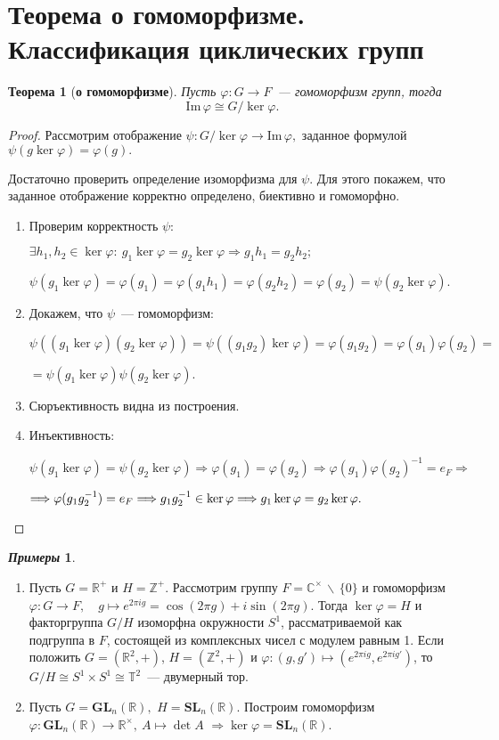 \documentclass[a4paper, 14pt]{extarticle}
\newcommand{\n}{\par}
\newcommand{\integers}{\mathbb{Z}}
\newcommand{\real}{\mathbb{R}}
\newcommand{\complex}{\mathbb{C}}
\newcommand{\GL}{\mathbf{GL}}
\newcommand{\SL}{\mathbf{SL}}
\newcommand{\suchthat}{{:}{ } \ }
\newcommand{\im}{\mathrm{Im} \,}
\renewcommand{\phi}{\varphi}
\theoremstyle{definition}
\newtheorem*{exmpls}{\textit{Примеры}}
\theoremstyle{plain}
\newtheorem*{theorem*}{Теорема}
\numberwithin{theorem}{section}
\numberwithin{definition}{section}
\numberwithin{statement}{section}
\numberwithin{lemma}{section}
\numberwithin{consequence}{section}
\begin{document}
	\section{Теорема о гомоморфизме. Классификация циклических групп}
	\begin{theorem*}[\textbf{о гомоморфизме}]
		Пусть ${\phi: G \rightarrow F}$~--- гомоморфизм групп, тогда
		\begin{equation*}
			\im \phi \cong G/ \ker \phi.
		\end{equation*}
	\end{theorem*}
	\begin{proof}
		Рассмотрим отображение ${\psi: G/ \ker \phi \rightarrow \im \phi,}$ заданное формулой ${\psi(g \ker \phi) = \phi(g).}$ \n
		Достаточно проверить определение изоморфизма для $\psi.$ Для этого покажем, что заданное отображение корректно определено, биективно и гомоморфно.
		\begin{enumerate}
			\setlength\itemsep{0.1em}
			\item Проверим корректность $\psi{:}$ \n
			$\exists h_1, h_2 \in \ker \phi \suchthat g_1 \ker \phi = g_2 \ker \phi \Longrightarrow g_1 h_1 = g_2 h_2;$ \n
			$\psi(g_1 \ker \phi) = \phi(g_1) = \phi(g_1 h_1) = \phi(g_2 h_2) = \phi(g_2) = \psi(g_2 \ker \phi).$
			\item Докажем, что $\psi$~--- гомоморфизм: \n
			${\psi((g_1 \ker \phi)(g_2 \ker \phi)) = \psi ((g_1g_2) \ker \phi) = \phi(g_1 g_2) = \phi(g_1) \phi(g_2) =}$ \n
			${=\psi(g_1 \ker \phi) \psi(g_2 \ker \phi).}$
			\item Сюръективность видна из построения.
			\item Инъективность: \n
			${\psi(g_1 \ker \phi) = \psi(g_2 \ker \phi) \Longrightarrow \phi(g_1) = \phi(g_2) \Longrightarrow \phi(g_1) \phi(g_2)^{-1} = e_F \Longrightarrow}$ \n $\Longrightarrow \phi(g_1g_2^{-1}) = e_F \Longrightarrow g_1g_2^{-1} \in \ker \phi \Longrightarrow g_1 \ker \phi = g_2 \ker \phi. \qedhere$
		\end{enumerate} 
	\end{proof}
        \newpage
	\begin{exmpls}
        \
        \begin{enumerate}
            \setlength\itemsep{0.1em}
            \item Пусть ${G = \real ^ +}$ и ${H = \integers ^ +}$. Рассмотрим группу ${F = \complex^{\times} \, \backslash \, \{0\}}$ и гомоморфизм ${\phi: G \rightarrow F}, {\quad g \mapsto e^{2\pi i g} = \cos(2\pi g) + i \sin(2\pi g).}$
		Тогда ${\ker \phi = H}$ и факторгруппа $G/H$ изоморфна окружности $S^1$, рассматриваемой как подгруппа в $F$, состоящей из комплексных чисел с модулем равным 1. Если положить ${G = (\real^2, +)}$, ${H = (\integers^2, +)}$ и ${\phi : (g, g') \mapsto (e^{2\pi i g}, e^{2\pi i g'})}$, то ${G/H \cong S^1 \times S^1 \cong \mathbb{T}^2}$~--- двумерный тор.
            \item Пусть ${G = \GL_n(\real),}$ ${H = \SL_n(\real)}.$ Построим гомоморфизм ${\phi : \GL_n(\real) \rightarrow \real^{\times}, \ A \mapsto \det A}$ ${\Rightarrow \ker \phi = \SL_n(\real).}$
        \end{enumerate}
	\end{exmpls}
\end{document}
